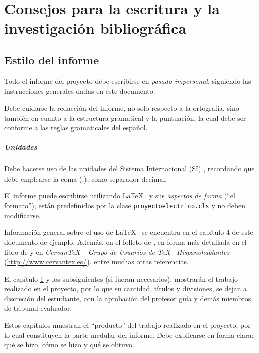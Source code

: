   \chapter{Consejos para la escritura y la investigación bibliográfica}
\label{C:desarrollo}

\section{Estilo del informe}

Todo el informe del proyecto debe escribirse en \emph{pasado impersonal}, siguiendo las instrucciones generales dadas en este documento. 

Debe cuidarse la redacción del informe, no solo respecto a la ortografía, sino también en cuanto a la estructura gramatical y la puntuación, la cual debe ser conforme a las reglas gramaticales del español.

\paragraph{Unidades}

Debe hacerse uso de las unidades del Sistema Internacional (SI) \cite{RTCR443-2010}, recordando que debe emplearse la coma (,), como separador decimal.

El informe puede escribirse utilizando \LaTeX~ y sus \emph{aspectos de forma} (``el formato''), están predefinidos por la clase \texttt{proyectoelectrico.cls} y no deben modificarse.

Información general sobre el uso de \LaTeX~ se encuentra en el capítulo 4 de este documento de ejemplo. Además, en el folleto de \cite{nsces}, en forma más detallada en el libro de \cite{latexcomp} y en \emph{CervanTeX - Grupo de Usuarios de \TeX~ Hispanohablantes} (\url{http://www.cervantex.es/}), entre muchas otras referencias.

El capítulo \ref{C:desarrollo} y los subsiguientes (si fueran necesarios), mostrarán el trabajo realizado en el proyecto, por lo que su cantidad, títulos y divisiones, se dejan a discreción del estudiante, con la aprobación del profesor guía y demás miembros de tribunal evaluador.

Estos capítulos muestran el ``producto'' del trabajo realizado en el proyecto, por lo cual constituyen la parte medular del informe. Debe explicarse en forma clara: qué se hizo, cómo se hizo y qué se obtuvo.

